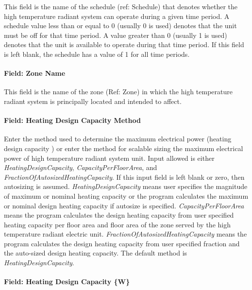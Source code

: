 This field is the name of the schedule (ref: Schedule) that denotes whether the high temperature radiant system can operate during a given time period. A schedule value less than or equal to 0 (usually 0 is used) denotes that the unit must be off for that time period. A value greater than 0 (usually 1 is used) denotes that the unit is available to operate during that time period. If this field is left blank, the schedule has a value of 1 for all time periods.

\paragraph{Field: Zone Name}\label{field-zone-name-3-004}

This field is the name of the zone (Ref: Zone) in which the high temperature radiant system is principally located and intended to affect.

\paragraph{Field: Heating Design Capacity Method}\label{field-heating-design-capacity-method-7}

Enter the method used to determine the maximum electrical power (heating design capacity ) or enter the method for scalable sizing the maximum electrical power of high temperature radiant system unit. Input allowed is either \emph{HeatingDesignCapacity}, \emph{CapacityPerFloorArea}, and \emph{FractionOfAutosizedHeatingCapacity}. If this input field is left blank or zero, then autosizing is assumed. \emph{HeatingDesignCapacity} means user specifies the magnitude of maximum or nominal heating capacity or the program calculates the maximum or nominal design heating capacity if autosize is specified. \emph{CapacityPerFloorArea} means the program calculates the design heating capacity from user specified heating capacity per floor area and floor area of the zone served by the high temperature radiant electric unit. \emph{FractionOfAutosizedHeatingCapacity} means the program calculates the design heating capacity from user specified fraction and the auto-sized design heating capacity. The default method is \emph{HeatingDesignCapacity}.

\paragraph{Field: Heating Design Capacity \{W\}}\label{field-heating-design-capacity-w-7}

